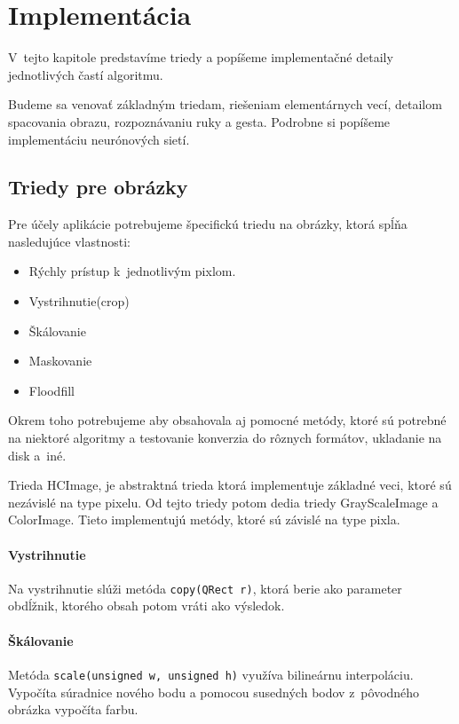 \chapter{Implementácia}\label{chap:implementation}

V~tejto kapitole predstavíme triedy a popíšeme implementačné detaily jednotlivých častí algoritmu.

Budeme sa venovať základným triedam, riešeniam elementárnych vecí, detailom spacovania obrazu, rozpoznávaniu ruky a gesta. Podrobne si popíšeme implementáciu neurónových sietí.
\bigskip

\section{Triedy pre obrázky}

Pre účely aplikácie potrebujeme špecifickú triedu na obrázky, ktorá spĺňa nasledujúce vlastnosti:
\begin{itemize}
\item Rýchly prístup k~jednotlivým pixlom.
\item Vystrihnutie(crop)
\item Škálovanie
\item Maskovanie
\item Floodfill
\end{itemize}
Okrem toho potrebujeme aby obsahovala aj pomocné metódy, ktoré sú potrebné na niektoré algoritmy a testovanie konverzia do rôznych formátov, ukladanie na disk a~iné.

Trieda HCImage, je abstraktná trieda ktorá implementuje základné veci, ktoré sú nezávislé na type pixelu. Od tejto triedy potom dedia triedy GrayScaleImage a ColorImage. Tieto implementujú metódy, ktoré sú závislé na type pixla. 


\subsubsection{Vystrihnutie}
Na vystrihnutie slúži metóda {\tt copy(QRect r)}, ktorá berie ako parameter obdĺžnik, ktorého obsah potom vráti ako výsledok. 

\subsubsection{Škálovanie}
Metóda {\tt scale(unsigned w, unsigned h)} využíva bilineárnu interpoláciu. Vypočíta súradnice nového bodu a pomocou susedných bodov z~pôvodného obrázka vypočíta farbu.

